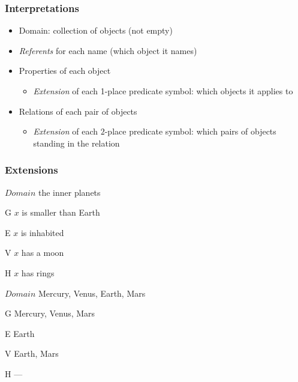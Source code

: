 \begin{frame}
\frametitle{Interpretations}

\begin{itemize}[<+->]
\item Domain: collection of objects (not empty)
\item \emph{Referents} for each name (which object it names)
\item Properties of each object
  \begin{itemize}
  \item \emph{Extension} of each 1-place predicate symbol: which
  objects it applies to
  \end{itemize}
\item Relations of each pair of objects
\begin{itemize}
\item \emph{Extension} of each $2$-place predicate symbol: which pairs of
  objects standing in the relation
\end{itemize}
\end{itemize}

\end{frame}

\begin{frame}
\frametitle{Extensions}

\begin{ekey}
  \item[$Domain$] the inner planets
  \item[G\qv{x}] $x$ is smaller than Earth
  \item[E\qv{x}] $x$ is inhabited
  \item[V\qv{x}] $x$ has a moon
  \item[H\qv{x}] $x$ has rings
\end{ekey}

\begin{ekey}
\item[$Domain$] Mercury, Venus, Earth, Mars
\item[G\qv{x}] Mercury, Venus, Mars
\item[E\qv{x}] Earth
\item[V\qv{x}] Earth, Mars
\item[H\qv{x}] ---
\end{ekey}
\end{frame}

